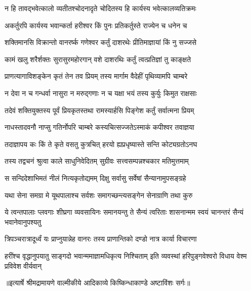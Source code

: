 \twolineshloka
{न हि तावद्भवेत्कालो व्यतीतश्चोदनादृते}
{चोदितस्य हि कार्यस्य भवेत्कालव्यतिक्रमः} %

\twolineshloka
{अकर्तुरपि कार्यस्य भवान्कर्ता हरीश्वर}
{किं पुनः प्रतिकर्तुस्ते राज्येन च धनेन च} %

\twolineshloka
{शक्तिमानसि विक्रान्तो वानरर्ष्क गणेश्वर}
{कर्तुं दाशरथेः प्रीतिमाज्ञायां किं नु सज्जसे} %

\twolineshloka
{कामं खलु शरैर्शक्तः सुरासुरमहोरगान्}
{वशे दाशरथिः कर्तुं त्वत्प्रतिज्ञां तु काङ्क्षते} %

\twolineshloka
{प्राणत्यागाविशङ्केन कृतं तेन तव प्रियम्}
{तस्य मार्गाम वैदेहीं पृथिव्यामपि चाम्बरे} %

\twolineshloka
{न देवा न च गन्धर्वा नासुरा न मरुद्गणाः}
{न च यक्षा भयं तस्य कुर्युः किमुत राक्षसाः} %

\twolineshloka
{तदेवं शक्तियुक्तस्य पूर्वं प्रियकृतस्तथा}
{रामस्यार्हसि पिङ्गेश कर्तुं सर्वात्मना प्रियम्} %

\twolineshloka
{नाधस्तादवनौ नाप्सु गतिर्नोपरि चाम्बरे}
{कस्यचित्सज्जतेऽस्माकं कपीश्वर तवाज्ञया} %

\twolineshloka
{तदाज्ञापय कः किं ते कृते वसतु कुत्रचित्}
{हरयो ह्यप्रधृष्यास्ते सन्ति कोट्यग्रतोऽनघ} %

\twolineshloka
{तस्य तद्वचनं श्रुत्वा काले साधुनिवेदितम्}
{सुग्रीवः सत्त्वसम्पन्नश्चकार मतिमुत्तमाम्} %

\twolineshloka
{स सन्दिदेशाभिमतं नीलं नित्यकृतोद्यमम्}
{दिक्षु सर्वासु सर्वेषां सैन्यानामुपसङ्ग्रहे} %

\twolineshloka
{यथा सेना समग्रा मे यूथपालाश्च सर्वशः}
{समागच्छन्त्यसङ्गेन सेनाग्राणि तथा कुरु} %

\threelineshloka
{ये त्वन्तपालाः प्लवगाः शीघ्रगा व्यवसायिनः}
{समानयन्तु ते सैन्यं त्वरिताः शासनान्मम}
{स्वयं चानन्तरं सैन्यं भवानेवानुपश्यतु} %

\twolineshloka
{त्रिपञ्चरात्रादूर्ध्वं यः प्राप्नुयान्नेह वानरः}
{तस्य प्राणान्तिको दण्डो नात्र कार्या विचारणा} %

\fourlineindentedshloka
{हरींश्च वृद्धानुपयातु साङ्गदो}
{भवान्ममाज्ञामधिकृत्य निश्चिताम्}
{इति व्यवस्थां हरिपुङ्गवेश्वरो}
{विधाय वेश्म प्रविवेश वीर्यवान्} %


{॥इत्यार्षे श्रीमद्रामायणे वाल्मीकीये आदिकाव्ये किष्किन्धाकाण्डे अष्टाविंशः सर्गः॥}


